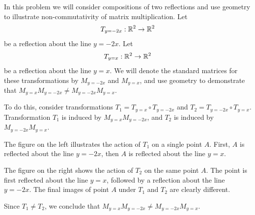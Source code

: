 \documentclass{ximera}
\begin{document}
\begin{exploration}\label{init:reflectioncomp}  In this problem we will consider compositions of two reflections and use geometry to illustrate non-commutativity of matrix multiplication.  
Let $$T_{y=-2x}:\mathbb{R}^2\rightarrow \mathbb{R}^2$$ be a reflection about the line $y=-2x$.  Let $$T_{y=x}:\mathbb{R}^2\rightarrow \mathbb{R}^2$$ be a reflection about the line $y=x$. We will denote the standard matrices for these transformations by $M_{y=-2x}$ and $M_{y=x}$, and
use geometry to demonstrate that $M_{y=x}M_{y=-2x}\neq M_{y=-2x}M_{y=x}$.  
 
 To do this, consider transformations $T_1=T_{y=x}\circ T_{y=-2x}$ and $T_2=T_{y=-2x}\circ T_{y=x}$.  Transformation $T_1$ is induced by $M_{y=x}M_{y=-2x}$, and $T_2$ is induced by $M_{y=-2x}M_{y=x}$.

The figure on the left illustrates the action of $T_1$ on a single point $A$.  First, $A$ is reflected about the line $y=-2x$, then $A$ is reflected about the line $y=x$.   

The figure on the right shows the action of $T_2$ on the same point $A$.  The point is first reflected about the line $y=x$, followed by a reflection about the line $y=-2x$.  The final images of point $A$ under $T_1$ and $T_2$ are clearly different.

\begin{center}
  \quad\quad
{}
\end{center}

Since $T_1\neq T_2$, we conclude that $M_{y=x}M_{y=-2x}\neq M_{y=-2x}M_{y=x}$.

\end{exploration}
\end{document}
